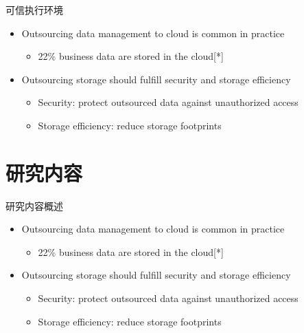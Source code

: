 \documentclass{beamer}
\begin{document}
\begin{frame}{可信执行环境}
    \begin{itemize}
        \item Outsourcing data management to cloud is common in practice
              \begin{itemize}
                  \item 22\% business data are stored in the cloud[*]
              \end{itemize}
        \item  Outsourcing storage should fulfill security and storage efficiency
              \begin{itemize}
                  \item  Security: protect outsourced data against unauthorized access
                  \item  Storage efficiency: reduce storage footprints
              \end{itemize}
    \end{itemize}
\end{frame}

\section{研究内容}

\begin{frame}{研究内容概述}
    \begin{itemize}
        \item Outsourcing data management to cloud is common in practice
              \begin{itemize}
                  \item 22\% business data are stored in the cloud[*]
              \end{itemize}
        \item  Outsourcing storage should fulfill security and storage efficiency
              \begin{itemize}
                  \item  Security: protect outsourced data against unauthorized access
                  \item  Storage efficiency: reduce storage footprints
              \end{itemize}
    \end{itemize}
\end{frame}
\end{document}
